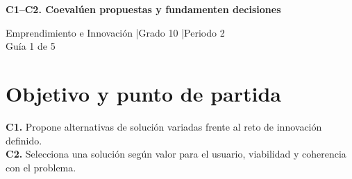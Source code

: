 \makeatletter
{}
\makeatother


\usepackage[spanish]{babel}
\usepackage{lmodern}
\usepackage{titlesec}
\geometry{a4paper,margin=1.6cm}
\linespread{1.10}

\hypersetup{allcolors=LinkColor}
\newcommand{\guidelink}[2]{\href{#1}{\textbf{\underline{#2}}}}
\newcommand{\instruction}[1]{\textcolor{InstructionColor}{\textbf{#1}}}
\newcommand{\concept}[1]{\textcolor{ConceptColor}{\textbf{#1}}}
\newcommand{\checkbox}{%
    \begingroup
    \setlength{\fboxrule}{0.4pt}%
    \setlength{\fboxsep}{2pt}%
    \fbox{\rule{0pt}{0.8ex}\rule{0.8ex}{0pt}}%
    \endgroup}

\setlength{\parskip}{4pt}
\setlength{\tabcolsep}{5pt}
\renewcommand{\arraystretch}{1.15}
\titleformat{\section}{\large\bfseries\color{HeadingColor}}{}{0pt}{}
\titlespacing*{\section}{0pt}{10pt}{3pt}




\begin{center}
{\Large\bfseries\color{HeadingColor} C1--C2. Coevalúen propuestas y fundamenten decisiones\par}
\vspace{3pt}
Emprendimiento e Innovación \enspace|\enspace Grado 10 \enspace|\enspace Periodo 2\\
Guía 1 de 5
\end{center}

\section*{Objetivo y punto de partida}
\concept{C1.} Propone alternativas de solución variadas frente al reto de innovación definido.\\
\concept{C2.} Selecciona una solución según valor para el usuario, viabilidad y coherencia con el problema.

